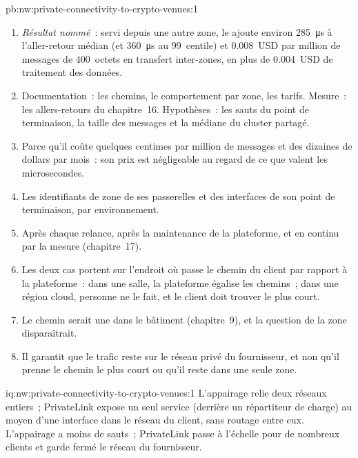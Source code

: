 \begin{solution}{pb:nw:private-connectivity-to-crypto-venues:1}
\begin{enumerate}[resume]
\item \emph{Résultat nommé}~: servi depuis une autre zone, le  ajoute environ \qty{285}{\micro\second} à l'aller-retour médian (et
  \qty{360}{\micro\second} au 99~centile) et 0.008~USD par million de messages de 400~octets en transfert inter-zones, en plus de 0.004~USD de
  traitement des données.
\item Documentation~: les chemins, le comportement par zone, les tarifs. Mesure~: les allers-retours du chapitre~16. Hypothèses~: les sauts du point de terminaison, la taille des messages
  et la médiane du cluster partagé.
\item Parce qu'il coûte quelques centimes par million de messages et des dizaines de dollars par mois~: son prix est négligeable au regard de ce que valent les microsecondes.
\item Les identifiants de zone de ses passerelles et des interfaces de son point de terminaison, par environnement.
\item Après chaque relance, après la maintenance de la plateforme, et en continu par la mesure (chapitre~17).
\item Les deux cas portent sur l'endroit où passe le chemin du client par rapport à la plateforme~: dans une salle, la plateforme égalise les chemins~; dans une région cloud, personne ne le fait, et
  le client doit trouver le plus court.
\item Le chemin serait une  dans le bâtiment (chapitre~9), et la question de la zone disparaîtrait.
\item Il garantit que le trafic reste sur le réseau privé du fournisseur, et non qu'il prenne le chemin le plus court ou qu'il reste dans une seule zone.
\end{enumerate}
\end{solution}

\begin{solution}{iq:nw:private-connectivity-to-crypto-venues:1}
L'appairage relie deux réseaux entiers~; PrivateLink expose un seul service (derrière un répartiteur de charge) au moyen d'une interface dans le réseau du client,
sans routage entre eux. L'appairage a moins de sauts~; PrivateLink passe à l'échelle pour de nombreux clients et garde fermé le réseau du fournisseur.
\end{solution}

